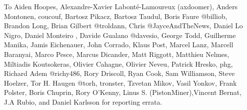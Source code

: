 \par
To Aiden Hoopes, Alexandre-Xavier Labont\'{e}-Lamoureux (axdoomer), Anders Montonen, coucouf, Bartosz Pikacz, Bartosz Taudul, Boris Faure @billiob, Brandon Long, Brian Gilbert @troldann, Chris @JayceAndTheNews, Daniel Lo Nigro, Daniel Monteiro , Davide Gualano @davesio, George Todd, Guilherme Manika, Jamis Eichenauer, John Corrado, Klaus Post, Marcel Lanz, Marcell Baranyai, Marco Pesce, Marcus Dicander, Matt Riggott, Matthieu Nelmes, Miltiadis Koutsokeras, Olivier Cahagne, Olivier Neveu, Patrick Hresko, phg, Richard Adem @richy486, Rory Driscoll, Ryan Cook, Sam Williamson, Steve Hoelzer, Tor H. Haugen @torh, tronster, Tzvetan Mikov, Vasil Yonkov, Frank Polster, Boris Chuprin, Rory O'Kenny, Linus S. (PistonMiner),Vincent Bernat, J.A Rubio, and Daniel Karlsson for reporting errata.\\

